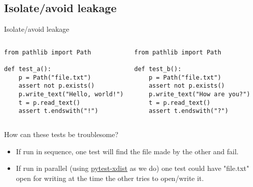 \documentclass[12pt,aspectratio=169]{beamer}
\begin{document}
\subsection{Isolate/avoid leakage}
\begin{frame}[fragile]{Isolate/avoid leakage}
\begin{columns}[T]
\column{0.45\paperwidth}
\begin{verbatim}
from pathlib import Path

def test_a():
    p = Path("file.txt")
    assert not p.exists()
    p.write_text("Hello, world!")
    t = p.read_text()
    assert t.endswith("!")
\end{verbatim}

\column{0.45\paperwidth}
\begin{verbatim}
from pathlib import Path

def test_b():
    p = Path("file.txt")
    assert not p.exists()
    p.write_text("How are you?")
    t = p.read_text()
    assert t.endswith("?")
\end{verbatim}
\end{columns}

\medskip
How can these tests be troublesome?\pause
\begin{itemize}
  \item If run in sequence, one test will find the file made by the other and fail.
  \item If run in parallel (using \href{https://pytest-xdist.readthedocs.io/en/latest/}{pytest-xdist} as we do) one test could have "file.txt" open for writing at the time the other tries to open/write it.
\end{itemize}
\end{frame}
\end{document}
